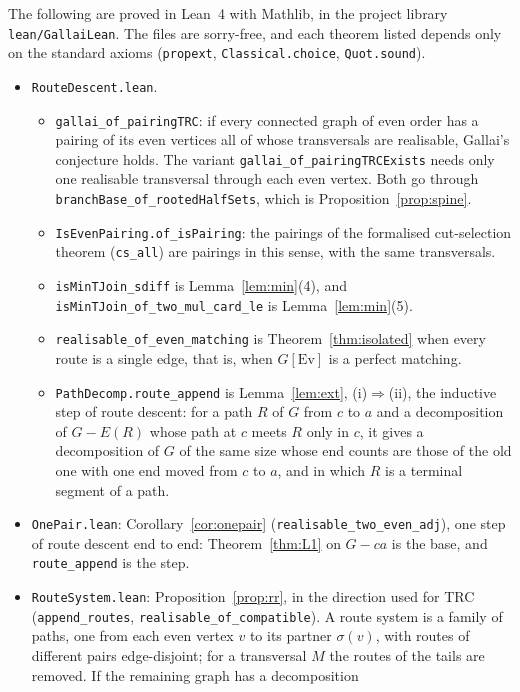 \documentclass[11pt]{amsart}
\theoremstyle{definition}
\newcommand{\Ev}{\mathrm{Ev}}
\begin{document}
The following are proved in Lean~4 with Mathlib, in the project library \texttt{lean/GallaiLean}. The
files are sorry-free, and each theorem listed depends only on the standard axioms (\texttt{propext},
\texttt{Classical.choice}, \texttt{Quot.sound}).
\begin{itemize}
\item \texttt{RouteDescent.lean}.
  \begin{itemize}
  \item \texttt{gallai\_of\_pairingTRC}: if every connected graph of even order has a pairing of its
  even vertices all of whose transversals are realisable, Gallai's conjecture holds. The variant
  \texttt{gallai\_of\_pairingTRCExists} needs only one realisable transversal through each even vertex.
  Both go through \texttt{branchBase\_of\_rootedHalfSets}, which is Proposition~\ref{prop:spine}.
  \item \texttt{IsEvenPairing.of\_isPairing}: the pairings of the formalised cut-selection theorem
  (\texttt{cs\_all}) are pairings in this sense, with the same transversals.
  \item \texttt{isMinTJoin\_sdiff} is Lemma~\ref{lem:min}(4), and
  \texttt{isMinTJoin\_of\_two\_mul\_card\_le} is Lemma~\ref{lem:min}(5).
  \item \texttt{realisable\_of\_even\_matching} is Theorem~\ref{thm:isolated} when every route is a
  single edge, that is, when $G[\Ev]$ is a perfect matching.
  \item \texttt{PathDecomp.route\_append} is Lemma~\ref{lem:ext}, (i)$\Rightarrow$(ii), the inductive
  step of route descent: for a path $R$ of $G$ from $c$ to $a$ and a decomposition of $G-E(R)$ whose path
  at $c$ meets $R$ only in $c$, it gives a decomposition of $G$ of the same size whose end counts are
  those of the old one with one end moved from $c$ to $a$, and in which $R$ is a terminal segment of
  a path.
  \end{itemize}
\item \texttt{OnePair.lean}: Corollary~\ref{cor:onepair} (\texttt{realisable\_two\_even\_adj}), one
step of route descent end to end: Theorem~\ref{thm:L1} on $G-ca$ is the base, and
\texttt{route\_append} is the step.
\item \texttt{RouteSystem.lean}: Proposition~\ref{prop:rr}, in the direction used for TRC
(\texttt{append\_routes}, \texttt{realisable\_of\_compatible}). A route system is a family of paths, one
from each even vertex $v$ to its partner $\sigma(v)$, with routes of different pairs edge-disjoint;
for a transversal $M$ the routes of the tails are removed. If the remaining graph has a decomposition

\end{itemize}
\end{document}
